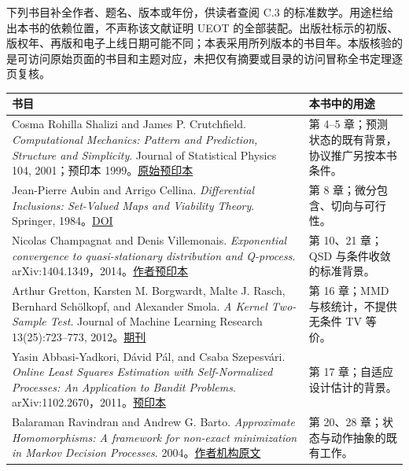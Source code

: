 \documentclass[
  11pt,
  oneside]{book}
\newcounter{none} %
\begin{document}
下列书目补全作者、题名、版本或年份，供读者查阅 C.3 的标准数学。用途栏给出本书的依赖位置，不声称该文献证明 UEOT 的全部装配。出版社标示的初版、版权年、再版和电子上线日期可能不同；本表采用所列版本的书目年。本版核验的是可访问原始页面的书目和主题对应，未把仅有摘要或目录的访问冒称全书定理逐页复核。

{\def\LTcaptype{none} %
\begin{longtable}[]{@{}
  >{\raggedright\arraybackslash}p{}
  >{\raggedright\arraybackslash}p{}@{}}
\toprule\noalign{}
\begin{minipage}[b]{\linewidth}\raggedright
书目
\end{minipage} & \begin{minipage}[b]{\linewidth}\raggedright
本书中的用途
\end{minipage} \\
\midrule\noalign{}
\endhead
\bottomrule\noalign{}
\endlastfoot
Cosma Rohilla Shalizi and James P. Crutchfield. \emph{Computational Mechanics: Pattern and Prediction, Structure and Simplicity}. Journal of Statistical Physics 104, 2001；预印本 1999。\href{https://arxiv.org/abs/cond-mat/9907176}{原始预印本} & 第 4--5 章；预测状态的既有背景，协议推广另按本书条件。 \\
Jean-Pierre Aubin and Arrigo Cellina. \emph{Differential Inclusions: Set-Valued Maps and Viability Theory}. Springer, 1984。\href{https://doi.org/10.1007/978-3-642-69512-4}{DOI} & 第 8 章；微分包含、切向与可行性。 \\
Nicolas Champagnat and Denis Villemonais. \emph{Exponential convergence to quasi-stationary distribution and Q-process}. arXiv:1404.1349，2014。\href{https://arxiv.org/abs/1404.1349}{作者预印本} & 第 10、21 章；QSD 与条件收敛的标准背景。 \\
Arthur Gretton, Karsten M. Borgwardt, Malte J. Rasch, Bernhard Schölkopf, and Alexander Smola. \emph{A Kernel Two-Sample Test}. Journal of Machine Learning Research 13(25):723--773, 2012。\href{https://www.jmlr.org/papers/v13/gretton12a.html}{期刊} & 第 16 章；MMD 与核统计，不提供无条件 TV 等价。 \\
Yasin Abbasi-Yadkori, Dávid Pál, and Csaba Szepesvári. \emph{Online Least Squares Estimation with Self-Normalized Processes: An Application to Bandit Problems}. arXiv:1102.2670，2011。\href{https://arxiv.org/abs/1102.2670}{预印本} & 第 17 章；自适应设计估计的背景。 \\
Balaraman Ravindran and Andrew G. Barto. \emph{Approximate Homomorphisms: A framework for non-exact minimization in Markov Decision Processes}. 2004。\href{https://all.cs.umass.edu/pubs/2004/ravindran_b_KBCS04.pdf}{作者机构原文} & 第 20、28 章；状态与动作抽象的既有工作。 \\

\end{longtable}}
\end{document}
